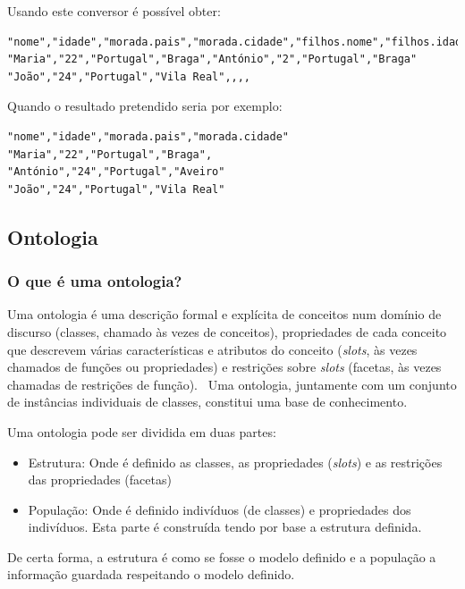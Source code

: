 Usando este conversor é possível obter:
\begin{lstlisting}[caption=Resultado da conversão do exemplo~\ref{exem:jsonBib2} usando o conversor \texttt{json2csv}]
"nome","idade","morada.pais","morada.cidade","filhos.nome","filhos.idade","filhos.morada.pais","filhos.morada.cidade"
"Maria","22","Portugal","Braga","António","2","Portugal","Braga"
"João","24","Portugal","Vila Real",,,,
\end{lstlisting}

Quando o resultado pretendido seria por exemplo:
\begin{lstlisting}[caption=Resultado pretendido da conversão do exemplo~\ref{exem:jsonBib2}]
"nome","idade","morada.pais","morada.cidade"
"Maria","22","Portugal","Braga",
"António","24","Portugal","Aveiro"
"João","24","Portugal","Vila Real"
\end{lstlisting}

\subsection{Ontologia}

\subsubsection{O que é uma ontologia?}

Uma ontologia é uma descrição formal e explícita de conceitos num domínio de discurso (classes, chamado às vezes de conceitos), propriedades de cada conceito que descrevem várias características e atributos do conceito (\textit{slots}, às vezes chamados de funções ou propriedades) e restrições sobre \textit{slots} (facetas, às vezes chamadas de restrições de função).~\cite{ontologyProt} Uma ontologia, juntamente com um conjunto de instâncias individuais de classes, constitui uma base de conhecimento.~\cite{ontologyProt}

Uma ontologia pode ser dividida em duas partes:
\begin{itemize}
    \item Estrutura: Onde é definido as classes, as propriedades (\textit{slots}) e as restrições das propriedades (facetas)
    \item População: Onde é definido indivíduos (de classes) e propriedades dos indivíduos. Esta parte é construída tendo por base a estrutura definida.
\end{itemize}
De certa forma, a estrutura é como se fosse o modelo definido e a população a informação guardada respeitando o modelo definido.

